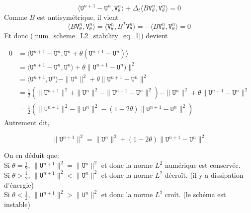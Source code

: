 \documentclass[12pt,a4paper]{article}
\numberwithin{equation}{section}
\begin{document}
\begin{equation}
    \langle \texttt{U}^{n+1}- \texttt{U}^n, \texttt{V}^n_\theta \rangle + \Delta_t \langle  B\texttt{V}^n_\theta , \texttt{V}^n_\theta  \rangle  = 0 \label{num_scheme_L2_stability_eq_1}
\end{equation}
Comme $B$ est antisymétrique, il vient 
$$\langle  B\texttt{V}^n_\theta , \texttt{V}^n_\theta  \rangle  = \langle  \texttt{V}^n_\theta , B^T\texttt{V}^n_\theta  \rangle  = -\langle  B\texttt{V}^n_\theta , \texttt{V}^n_\theta  \rangle  = 0$$
Et donc (\ref{num_scheme_L2_stability_eq_1}) devient

\begin{equation}\label{develop_theta_square}
\begin{split}
    0  &=   \langle \texttt{U}^{n+1}- \texttt{U}^n, \texttt{U}^{n} + \theta(\texttt{U}^{n+1}  - \texttt{U}^{n})\rangle  
    \\ &=   \langle \texttt{U}^{n+1}- \texttt{U}^n, \texttt{U}^{n}\rangle   + \theta\|\texttt{U}^{n+1}  - \texttt{U}^{n})\|^2
    \\ &=   \langle \texttt{U}^{n+1}, \texttt{U}^{n}\rangle -  \|\texttt{U}^{n}\|^2 + \theta\|\texttt{U}^{n+1}  - \texttt{U}^{n}\|^2
    \\ &=   \frac{1}{2}\left(\|\texttt{U}^{n+1}\|^2+ \|\texttt{U}^n\|^2 - \|\texttt{U}^{n+1}- \texttt{U}^n\|^2\right)-  \|\texttt{U}^{n}\|^2 + \theta\|\texttt{U}^{n+1}  - \texttt{U}^{n}\|^2
    \\ &=   \frac{1}{2}\left(\|\texttt{U}^{n+1}\|^2 - \|\texttt{U}^n\|^2 - (1 - 2\theta) \|\texttt{U}^{n+1}-  \texttt{U}^{n}\|^2 \right)
\end{split}
\end{equation}
Autrement dit, 

\begin{equation}
    \|\texttt{U}^{n+1}\|^2 = \|\texttt{U}^n\|^2 + (1 - 2\theta) \|\texttt{U}^{n+1}-  \texttt{U}^{n}\|^2
\end{equation}

On en déduit que:\\
Si $\theta = \frac{1}{2}$, $\|\texttt{U}^{n+1}\|^2 = \|\texttt{U}^n\|^2$ et donc la norme $L^2$ numérique est conservée.\\
Si $\theta > \frac{1}{2}$, $\|\texttt{U}^{n+1}\|^2 < \|\texttt{U}^n\|^2$ et donc la norme $L^2$ décroît. (il y a dissipation d'énergie)\\
Si $\theta < \frac{1}{2}$, $\|\texttt{U}^{n+1}\|^2 > \|\texttt{U}^n\|^2$ et donc la norme $L^2$ croît. (le schéma est instable)\\
\end{document}
